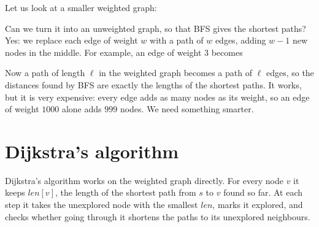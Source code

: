 \documentclass[a4paper,12pt,oneside]{report}
\begin{document}
Let us look at a smaller weighted graph:
\begin{center}
\end{center}
Can we turn it into an unweighted graph, so that BFS gives the
shortest paths? Yes: we replace each edge of weight $w$ with a path of
$w$ edges, adding $w-1$ new nodes in the middle. For example, an edge
of weight $3$ becomes
\begin{center}
\end{center}
Now a path of length $\ell$ in the weighted graph becomes a path of
$\ell$ edges, so the distances found by BFS are exactly the lengths of
the shortest paths. It works, but it is very expensive: every edge
adds as many nodes as its weight, so an edge of weight $1000$ alone
adds $999$ nodes. We need something smarter.

\section{Dijkstra's algorithm}
\label{sec:dijkstra}

Dijkstra's algorithm works on the weighted graph directly. For every
node $v$ it keeps $\mathit{len}[v]$, the length of the shortest path
from $s$ to $v$ found so far. At each step it takes the unexplored node
with the smallest $\mathit{len}$, marks it explored, and checks whether
going through it shortens the paths to its unexplored neighbours.
\end{document}
